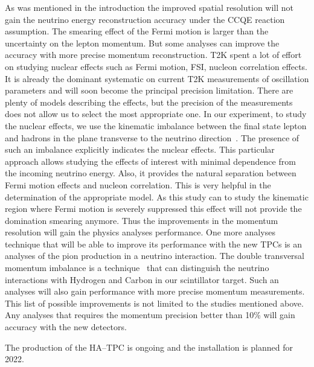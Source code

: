 \documentclass[../main.tex]{subfiles}
\begin{document}
As was mentioned in the introduction the improved spatial resolution will not gain the neutrino energy reconstruction accuracy under the CCQE reaction assumption. The smearing effect of the Fermi motion is larger than the uncertainty on the lepton momentum. But some analyses can improve the accuracy with more precise momentum reconstruction. T2K spent a lot of effort on studying nuclear effects such as Fermi motion, FSI, nucleon correlation effects. It is already the dominant systematic on current T2K measurements of oscillation parameters and will soon become the principal precision limitation. There are plenty of models describing the effects, but the precision of the measurements does not allow us to select the most appropriate one. In our experiment, to study the nuclear effects, we use the kinematic imbalance between the final state lepton and hadrons in the plane transverse to the neutrino direction~\cite{Lu2016}. The presence of such an imbalance explicitly indicates the nuclear effects.
This particular approach allows studying the effects of interest with minimal dependence from the incoming neutrino energy. Also, it provides the natural separation between Fermi motion effects and nucleon correlation. This is very helpful in the determination of the appropriate model. As this study can to study the kinematic region where Fermi motion is severely suppressed this effect will not provide the domination smearing anymore. Thus the improvements in the momentum resolution will gain the physics analyses performance. One more analyses technique that will be able to improve its performance with the new TPCs is an analyses of the pion production in a neutrino interaction. The double transversal momentum imbalance is a technique~\cite{Lu2015} that can distinguish the neutrino interactions with Hydrogen and Carbon in our scintillator target. Such an analyses will also gain performance with more precise momentum measurements. This list of possible improvements is not limited to the studies mentioned above. Any analyses that requires the momentum precision better than 10\% will gain accuracy with the new detectors.

The production of the HA--TPC is ongoing and the installation is planned for 2022.
\end{document}
